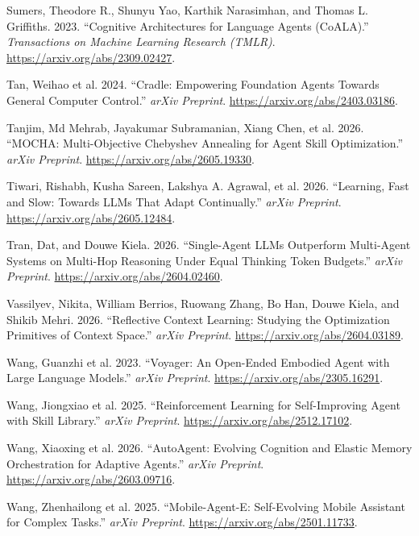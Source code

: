 \documentclass[
]{article}
\newlength{\cslhangindent}
\newenvironment{CSLReferences}[2] %
 {\begin{list}{}{%
  \setlength{\itemindent}{0pt}
  \setlength{\leftmargin}{0pt}
  \setlength{\parsep}{0pt}
  \ifodd #1
   \setlength{\leftmargin}{\cslhangindent}
   \setlength{\itemindent}{-1\cslhangindent}
  \fi
  \setlength{\itemsep}{#2\baselineskip}}}
 {\end{list}}
\begin{document}
\begin{CSLReferences}{1}{1}
Sumers, Theodore R., Shunyu Yao, Karthik Narasimhan, and Thomas L.
Griffiths. 2023. {``Cognitive Architectures for Language Agents
({CoALA}).''} \emph{Transactions on Machine Learning Research (TMLR)}.
\url{https://arxiv.org/abs/2309.02427}.

{Tan, Weihao et al.} 2024. {``Cradle: Empowering Foundation Agents
Towards General Computer Control.''} \emph{arXiv Preprint}.
\url{https://arxiv.org/abs/2403.03186}.

Tanjim, Md Mehrab, Jayakumar Subramanian, Xiang Chen, et al. 2026.
{``{MOCHA}: Multi-Objective Chebyshev Annealing for Agent Skill
Optimization.''} \emph{arXiv Preprint}.
\url{https://arxiv.org/abs/2605.19330}.

Tiwari, Rishabh, Kusha Sareen, Lakshya A. Agrawal, et al. 2026.
{``Learning, Fast and Slow: Towards {LLMs} That Adapt Continually.''}
\emph{arXiv Preprint}. \url{https://arxiv.org/abs/2605.12484}.

Tran, Dat, and Douwe Kiela. 2026. {``Single-Agent {LLMs} Outperform
Multi-Agent Systems on Multi-Hop Reasoning Under Equal Thinking Token
Budgets.''} \emph{arXiv Preprint}.
\url{https://arxiv.org/abs/2604.02460}.

Vassilyev, Nikita, William Berrios, Ruowang Zhang, Bo Han, Douwe Kiela,
and Shikib Mehri. 2026. {``Reflective Context Learning: Studying the
Optimization Primitives of Context Space.''} \emph{arXiv Preprint}.
\url{https://arxiv.org/abs/2604.03189}.

{Wang, Guanzhi et al.} 2023. {``Voyager: An Open-Ended Embodied Agent
with Large Language Models.''} \emph{arXiv Preprint}.
\url{https://arxiv.org/abs/2305.16291}.

{Wang, Jiongxiao et al.} 2025. {``Reinforcement Learning for
Self-Improving Agent with Skill Library.''} \emph{arXiv Preprint}.
\url{https://arxiv.org/abs/2512.17102}.

{Wang, Xiaoxing et al.} 2026. {``{AutoAgent}: Evolving Cognition and
Elastic Memory Orchestration for Adaptive Agents.''} \emph{arXiv
Preprint}. \url{https://arxiv.org/abs/2603.09716}.

{Wang, Zhenhailong et al.} 2025. {``{Mobile-Agent-E}: Self-Evolving
Mobile Assistant for Complex Tasks.''} \emph{arXiv Preprint}.
\url{https://arxiv.org/abs/2501.11733}.


\end{CSLReferences}
\end{document}
